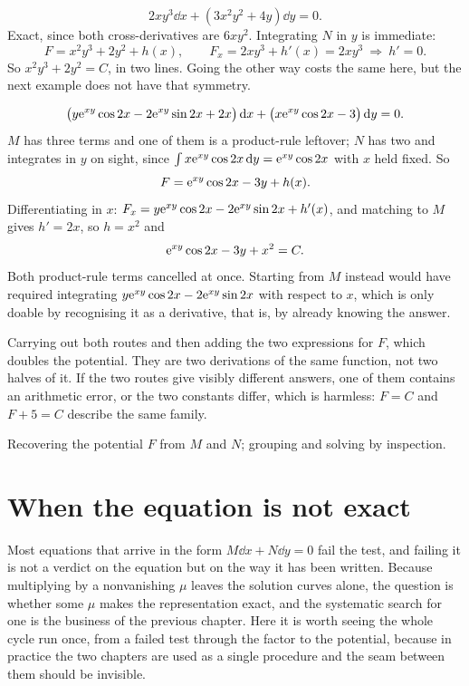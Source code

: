 \begin{worked}
\[2xy^{3}\dd x+(3x^{2}y^{2}+4y)\dd y=0.\]
Exact, since both cross-derivatives are $6xy^{2}$. Integrating $N$ in $y$ is immediate:
\[F=x^{2}y^{3}+2y^{2}+h(x),\qquad F_x=2xy^{3}+h'(x)=2xy^{3}\ \Longrightarrow\ h'=0.\]
So $x^{2}y^{3}+2y^{2}=C$, in two lines. Going the other way costs the same here, but the next example does not have that symmetry.
\end{worked}

\begin{worked}
\[\bigl(y\mathrm{e}^{xy}\cos2x-2\mathrm{e}^{xy}\sin2x+2x\bigr)\,\mathrm{d} x+\bigl(x\mathrm{e}^{xy}\cos2x-3\bigr)\,\mathrm{d} y=0.\]
$M$ has three terms and one of them is a product-rule leftover; $N$ has two and integrates in $y$ on sight, since $\int x\mathrm{e}^{xy}\cos2x\,\mathrm{d} y=\mathrm{e}^{xy}\cos2x$ with $x$ held fixed. So
\[F=\mathrm{e}^{xy}\cos2x-3y+h(x).\]
Differentiating in $x$: $F_x=y\mathrm{e}^{xy}\cos2x-2\mathrm{e}^{xy}\sin2x+h'(x)$, and matching to $M$ gives $h'=2x$, so $h=x^{2}$ and
\[\mathrm{e}^{xy}\cos2x-3y+x^{2}=C.\]
Both product-rule terms cancelled at once. Starting from $M$ instead would have required integrating $y\mathrm{e}^{xy}\cos2x-2\mathrm{e}^{xy}\sin2x$ with respect to $x$, which is only doable by recognising it as a derivative, that is, by already knowing the answer.
\end{worked}

\begin{trap}
Carrying out both routes and then adding the two expressions for $F$, which doubles the potential. They are two derivations of the same function, not two halves of it. If the two routes give visibly different answers, one of them contains an arithmetic error, or the two constants differ, which is harmless: $F=C$ and $F+5=C$ describe the same family.
\end{trap}

\begin{seealsob}Recovering the potential $F$ from $M$ and $N$; grouping and solving by inspection.\end{seealsob}

\section{When the equation is not exact}

Most equations that arrive in the form $M\dd x+N\dd y=0$ fail the test, and failing it is not a verdict on the equation but on the way it has been written. Because multiplying by a nonvanishing $\mu$ leaves the solution curves alone, the question is whether some $\mu$ makes the representation exact, and the systematic search for one is the business of the previous chapter. Here it is worth seeing the whole cycle run once, from a failed test through the factor to the potential, because in practice the two chapters are used as a single procedure and the seam between them should be invisible.

